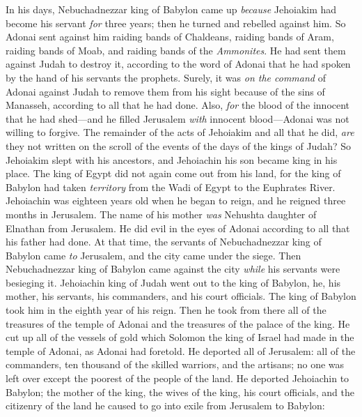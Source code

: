 \begin{biblechapter} %
 In his days, Nebuchadnezzar king of Babylon came up \textit{because} Jehoiakim had become his servant \textit{for} three years; then he turned and rebelled against him.
\verse So Adonai sent against him raiding bands of Chaldeans, raiding bands of Aram, raiding bands of Moab, and raiding bands of the \textit{Ammonites}. He had sent them against Judah to destroy it, according to the word of Adonai that he had spoken by the hand of his servants the prophets.
\verse Surely, it was \textit{on the command} of Adonai against Judah to remove them from his sight because of the sins of Manasseh, according to all that he had done.
\verse Also, \textit{for} the blood of the innocent that he had shed—and he filled Jerusalem \textit{with} innocent blood—Adonai was not willing to forgive.
\verse The remainder of the acts of Jehoiakim and all that he did, \textit{are} they not written on the scroll of the events of the days of the kings of Judah?
\verse So Jehoiakim slept with his ancestors, and Jehoiachin his son became king in his place.
\verse The king of Egypt did not again come out from his land, for the king of Babylon had taken \textit{territory} from the Wadi of Egypt to the Euphrates River.
 Jehoiachin was eighteen years old when he began to reign, and he reigned three months in Jerusalem. The name of his mother \textit{was} Nehushta daughter of Elnathan from Jerusalem.
\verse He did evil in the eyes of Adonai according to all that his father had done.
 At that time, the servants of Nebuchadnezzar king of Babylon came \textit{to} Jerusalem, and the city came under the siege.
\verse Then Nebuchadnezzar king of Babylon came against the city \textit{while} his servants were besieging it.
\verse Jehoiachin king of Judah went out to the king of Babylon, he, his mother, his servants, his commanders, and his court officials. The king of Babylon took him in the eighth year of his reign.
\verse Then he took from there all of the treasures of the temple of Adonai and the treasures of the palace of the king. He cut up all of the vessels of gold which Solomon the king of Israel had made in the temple of Adonai, as Adonai had foretold.
\verse He deported all of Jerusalem: all of the commanders, ten thousand of the skilled warriors, and the artisans; no one was left over except the poorest of the people of the land.
\verse He deported Jehoiachin to Babylon; the mother of the king, the wives of the king, his court officials, and the citizenry of the land he caused to go into exile from Jerusalem to Babylon:

\end{biblechapter}
